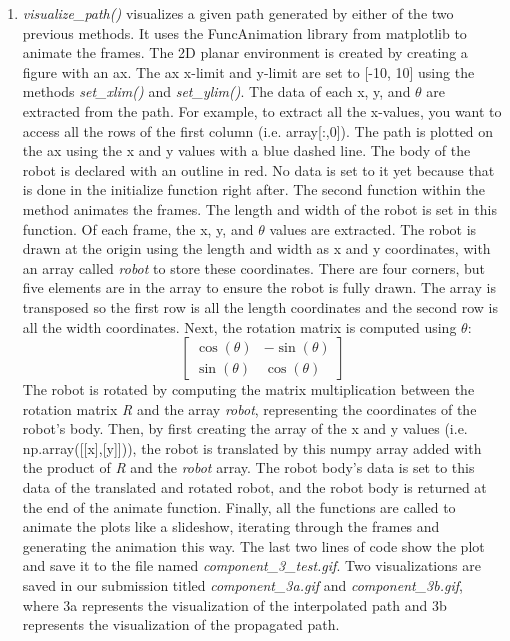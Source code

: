\documentclass{article}
\begin{document}
\begin{enumerate}
\item \textit{visualize\_path()} visualizes a given path generated by either of the two previous methods. It uses the FuncAnimation library from matplotlib to animate the frames. The 2D planar environment is created by creating a figure with an ax. The ax x-limit and y-limit are set to [-10, 10] using the methods \textit{set\_xlim()} and \textit{set\_ylim()}. The data of each x, y, and \(\theta\) are extracted from the path. For example, to extract all the x-values, you want to access all the rows of the first column (i.e. array[:,0]). The path is plotted on the ax using the x and y values with a blue dashed line. The body of the robot is declared with an outline in red. No data is set to it yet because that is done in the initialize function right after. The second function within the method animates the frames. The length and width of the robot is set in this function. Of each frame, the x, y, and \(\theta\) values are extracted. The robot is drawn at the origin using the length and width as x and y coordinates, with an array called \textit{robot} to store these coordinates. There are four corners, but five elements are in the array to ensure the robot is fully drawn. The array is transposed so the first row is all the length coordinates and the second row is all the width coordinates. Next, the rotation matrix is computed using \(\theta\):
\[
\begin{bmatrix}
\cos(\theta) & -\sin(\theta) \\
\sin(\theta) & \cos(\theta)
\end{bmatrix}
\]
The robot is rotated by computing the matrix multiplication between the rotation matrix \textit{R} and the array \textit{robot}, representing the coordinates of the robot's body. Then, by first creating the array of the x and y values (i.e. np.array([[x],[y]])), the robot is translated by this numpy array added with the product of \textit{R} and the \textit{robot} array. The robot body's data is set to this data of the translated and rotated robot, and the robot body is returned at the end of the animate function. Finally, all the functions are called to animate the plots like a slideshow, iterating through the frames and generating the animation this way. The last two lines of code show the plot and save it to the file named \textit{component\_3\_test.gif}. Two visualizations are saved in our submission titled \textit{component\_3a.gif} and \textit{component\_3b.gif}, where 3a represents the visualization of the interpolated path and 3b represents the visualization of the propagated path.
\end{enumerate}
\end{document}
